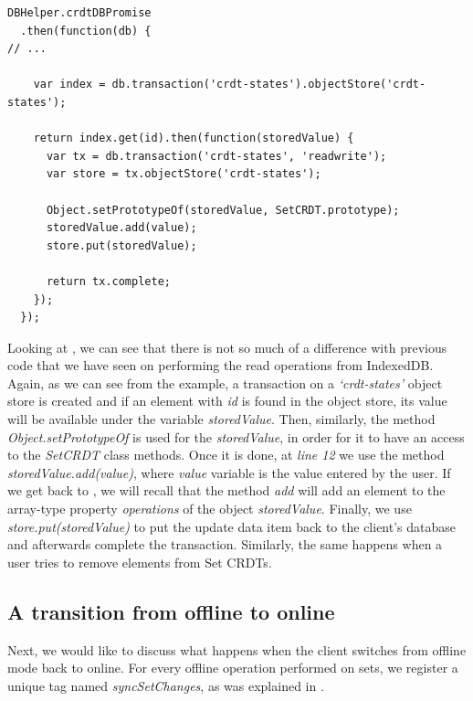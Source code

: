\begin{lstlisting}[caption={[Applying operation \textit{add} on a Set CRDT while offline]Performing an operation \textit{add} on a Set CRDT while the client is offline.}, label={lst:dev11}]
DBHelper.crdtDBPromise
  .then(function(db) {
// ...

    var index = db.transaction('crdt-states').objectStore('crdt-states');

    return index.get(id).then(function(storedValue) {
      var tx = db.transaction('crdt-states', 'readwrite');
      var store = tx.objectStore('crdt-states');

      Object.setPrototypeOf(storedValue, SetCRDT.prototype);
      storedValue.add(value);
      store.put(storedValue);

      return tx.complete;
    });
  });
\end{lstlisting}

Looking at , we can see that there is not so much of a difference with previous code that we have seen on performing the read operations from IndexedDB. Again, as we can see from the example, a transaction on a \textit{`crdt-states'} object store is created and if an element with \textit{id} is found in the object store, its value will be available under the variable \textit{storedValue}. Then, similarly, the method \textit{Object.setPrototypeOf} is used for the \textit{storedValue}, in order for it to have an access to the \textit{SetCRDT} class methods. Once it is done, at \textit{line 12} we use the method \textit{storedValue.add(value)}, where \textit{value} variable is the value entered by the user. If we get back to , we will recall that the method \textit{add} will add an element to the array-type property \textit{operations} of the object \textit{storedValue}. Finally, we use \textit{store.put(storedValue)} to put the update data item back to the client's database and afterwards complete the transaction. Similarly, the same happens when a user tries to remove elements from Set CRDTs.

\subsection*{A transition from offline to online}

Next, we would like to discuss what happens when the client switches from offline mode back to online. For every offline operation performed on sets, we register a unique tag named \textit{syncSetChanges}, as was explained in .

